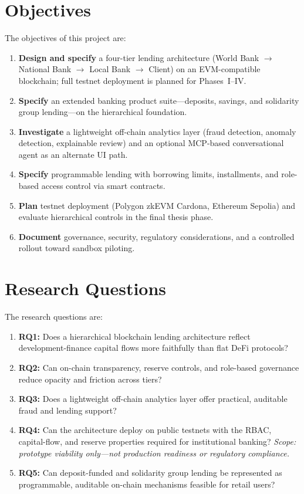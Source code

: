 \documentclass[12pt, a4paper]{report}
\begin{document}
\section{Objectives}

The objectives of this project are:

\begin{enumerate}[noitemsep]
\item \textbf{Design and specify} a four-tier lending architecture (World Bank $\to$ National Bank $\to$ Local Bank $\to$ Client) on an EVM-compatible blockchain; full testnet deployment is planned for Phases~I--IV.
\item \textbf{Specify} an extended banking product suite---deposits, savings, and solidarity group lending---on the hierarchical foundation.
\item \textbf{Investigate} a lightweight off-chain analytics layer (fraud detection, anomaly detection, explainable review) and an optional MCP-based conversational agent as an alternate UI path.
\item \textbf{Specify} programmable lending with borrowing limits, installments, and role-based access control via smart contracts.
\item \textbf{Plan} testnet deployment (Polygon zkEVM Cardona, Ethereum Sepolia) and evaluate hierarchical controls in the final thesis phase.
\item \textbf{Document} governance, security, regulatory considerations, and a controlled rollout toward sandbox piloting.
\end{enumerate}

\section{Research Questions}

The research questions are:

\begin{enumerate}[noitemsep]
\item \textbf{RQ1:} Does a hierarchical blockchain lending architecture reflect development-finance capital flows more faithfully than flat DeFi protocols?
\item \textbf{RQ2:} Can on-chain transparency, reserve controls, and role-based governance reduce opacity and friction across tiers?
\item \textbf{RQ3:} Does a lightweight off-chain analytics layer offer practical, auditable fraud and lending support?
\item \textbf{RQ4:} Can the architecture deploy on public testnets with the RBAC, capital-flow, and reserve properties required for institutional banking? \textit{Scope: prototype viability only---not production readiness or regulatory compliance.}
\item \textbf{RQ5:} Can deposit-funded and solidarity group lending be represented as programmable, auditable on-chain mechanisms feasible for retail users?
\end{enumerate}
\end{document}
